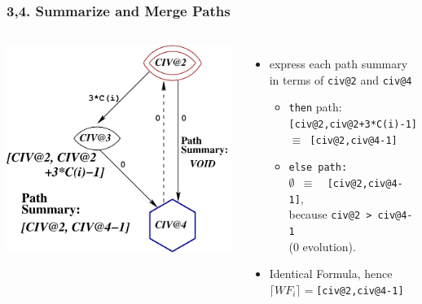 \documentclass{beamer}
\newcommand{\emphh}[1]{\textcolor{CosGreen}{ #1}}
\begin{document}
\begin{frame}[fragile,t]
\frametitle{3,4. Summarize and Merge Paths}

\begin{columns}
\includegraphics[height=35ex]{Figures/VEG_CORREC2.pdf}
\begin{itemize}
    \item[1] express each path summary in terms of {\tt civ@2} and {\tt civ@4}
    \begin{itemize}
        \item[a] {\tt then} path:\\
                    {\tt [civ@2,civ@2+3*C(i)-1]\\
                    $\equiv$\emphh{[civ@2,civ@4-1]}}
        \item[b] {\tt else path:}\\
                    {\tt $\emptyset$ $\equiv$ \emphh{[civ@2,civ@4-1]}},\\
                    because {\tt civ@2 > civ@4-1}\\(0 evolution).
    \end{itemize}\bigskip\pause
    \item[2] Identical Formula, hence $\lceil WF_i \rceil = ${\tt [civ@2,civ@4-1]}
\end{itemize}
\end{columns}

\end{frame}
\end{document}
